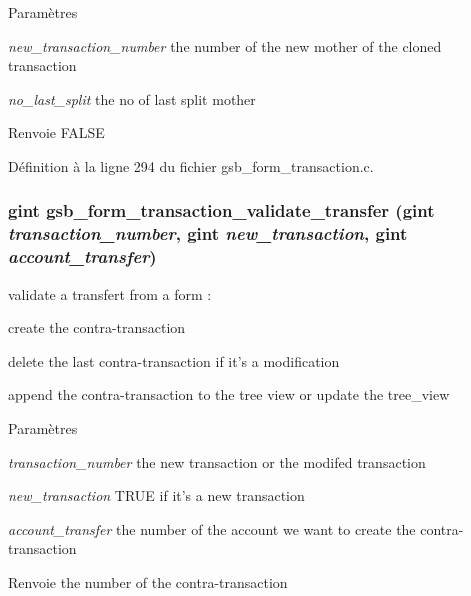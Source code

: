 \begin{DoxyParams}{Paramètres}
\item[{\em new\_\-transaction\_\-number}]the number of the new mother of the cloned transaction \item[{\em no\_\-last\_\-split}]the no of last split mother\end{DoxyParams}
\begin{DoxyReturn}{Renvoie}
FALSE 
\end{DoxyReturn}


Définition à la ligne 294 du fichier gsb\_\-form\_\-transaction.c.

\subsubsection[{gsb\_\-form\_\-transaction\_\-validate\_\-transfer}]{\setlength{\rightskip}{0pt plus 5cm}gint gsb\_\-form\_\-transaction\_\-validate\_\-transfer (gint {\em transaction\_\-number}, \/  gint {\em new\_\-transaction}, \/  gint {\em account\_\-transfer})}\label{gsb__form__transaction_8h_a71dba4f06ba2ca8857c36a489844dad7}
validate a transfert from a form :
\begin{DoxyItemize}
\item create the contra-\/transaction
\item delete the last contra-\/transaction if it's a modification
\item append the contra-\/transaction to the tree view or update the tree\_\-view
\end{DoxyItemize}


\begin{DoxyParams}{Paramètres}
\item[{\em transaction\_\-number}]the new transaction or the modifed transaction \item[{\em new\_\-transaction}]TRUE if it's a new transaction \item[{\em account\_\-transfer}]the number of the account we want to create the contra-\/transaction\end{DoxyParams}
\begin{DoxyReturn}{Renvoie}
the number of the contra-\/transaction 
\end{DoxyReturn}


